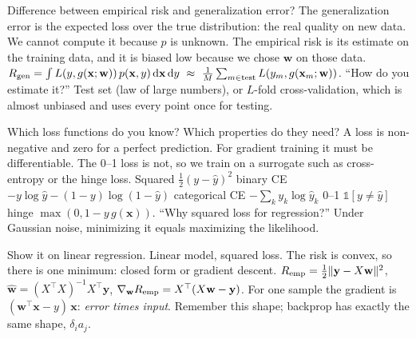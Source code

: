 \begin{qabox}[Klambauer]{\asked Difference between empirical risk and generalization error?}
\ans The generalization error is the expected loss over the true distribution: the real quality on
new data. We cannot compute it because $p$ is unknown. The empirical risk is its estimate on the
training data, and it is biased low because we chose $\mathbf{w}$ on those data.
\formula
$\Rgen=\int L(y,g(\mathbf{x};\mathbf{w}))\,p(\mathbf{x},y)\,\mathrm{d}\mathbf{x}\,\mathrm{d}y
\ \approx\ \frac1M\sum_{m\in\text{test}}L(y_m,g(\mathbf{x}_m;\mathbf{w}))$.
\follow ``How do you estimate it?'' Test set (law of large numbers), or $L$-fold cross-validation,
which is almost unbiased and uses every point once for testing.
\end{qabox}

\begin{qabox}[Klambauer]{\asked Which loss functions do you know? Which properties do they need?}
\ans A loss is non-negative and zero for a perfect prediction. For gradient training it must be
differentiable. The 0--1 loss is not, so we train on a surrogate such as cross-entropy or the hinge
loss.
\formula
Squared $\tfrac12(y-\hat y)^2$ \textbullet{} binary CE $-y\log\hat y-(1-y)\log(1-\hat y)$ \textbullet{}
categorical CE $-\sum_k y_k\log\hat y_k$ \textbullet{} 0--1 $\mathbb{1}[y\neq\hat y]$ \textbullet{}
hinge $\max(0,1-y\,g(\mathbf{x}))$.
\follow ``Why squared loss for regression?'' Under Gaussian noise, minimizing it equals maximizing
the likelihood.
\end{qabox}

\begin{qabox}[Klambauer]{\asked Show it on linear regression.}
\ans Linear model, squared loss. The risk is convex, so there is one minimum: closed form or
gradient descent.
\formula
$R_{\mathrm{emp}}=\tfrac12\lVert\mathbf{y}-X\mathbf{w}\rVert^2$,\quad
$\hat{\mathbf{w}}=(X^\top X)^{-1}X^\top\mathbf{y}$,\quad
$\nabla_{\mathbf{w}}R_{\mathrm{emp}}=X^\top(X\mathbf{w}-\mathbf{y})$.
\follow For one sample the gradient is $(\mathbf{w}^\top\mathbf{x}-y)\,\mathbf{x}$: \emph{error
times input}. Remember this shape; backprop has exactly the same shape, $\delta_i a_j$.
\end{qabox}

